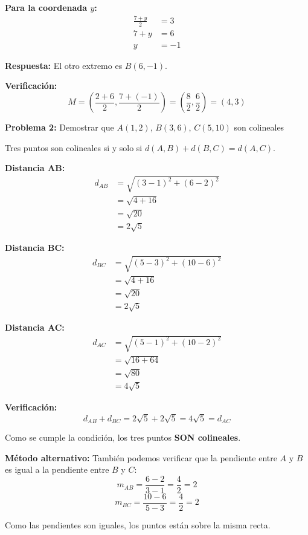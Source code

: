 \textbf{Para la coordenada $y$:}
\begin{align*}
\frac{7 + y}{2} &= 3 \\
7 + y &= 6 \\
y &= -1
\end{align*}

\textbf{Respuesta:} El otro extremo es $B(6, -1)$.

\textbf{Verificación:}
$$M = \left(\frac{2 + 6}{2}, \frac{7 + (-1)}{2}\right) = \left(\frac{8}{2}, \frac{6}{2}\right) = (4, 3)$$ \checkmark

\medskip

\textbf{Problema 2:} Demostrar que $A(1, 2)$, $B(3, 6)$, $C(5, 10)$ son colineales

Tres puntos son colineales si y solo si $d(A,B) + d(B,C) = d(A,C)$.

\textbf{Distancia AB:}
\begin{align*}
d_{AB} &= \sqrt{(3-1)^2 + (6-2)^2} \\
       &= \sqrt{4 + 16} \\
       &= \sqrt{20} \\
       &= 2\sqrt{5}
\end{align*}

\textbf{Distancia BC:}
\begin{align*}
d_{BC} &= \sqrt{(5-3)^2 + (10-6)^2} \\
       &= \sqrt{4 + 16} \\
       &= \sqrt{20} \\
       &= 2\sqrt{5}
\end{align*}

\textbf{Distancia AC:}
\begin{align*}
d_{AC} &= \sqrt{(5-1)^2 + (10-2)^2} \\
       &= \sqrt{16 + 64} \\
       &= \sqrt{80} \\
       &= 4\sqrt{5}
\end{align*}

\textbf{Verificación:}
$$d_{AB} + d_{BC} = 2\sqrt{5} + 2\sqrt{5} = 4\sqrt{5} = d_{AC}$$ \checkmark

Como se cumple la condición, los tres puntos \textbf{SON colineales}.

\textbf{Método alternativo:} También podemos verificar que la pendiente entre $A$ y $B$ es igual a la pendiente entre $B$ y $C$:
$$m_{AB} = \frac{6-2}{3-1} = \frac{4}{2} = 2$$
$$m_{BC} = \frac{10-6}{5-3} = \frac{4}{2} = 2$$

Como las pendientes son iguales, los puntos están sobre la misma recta.

